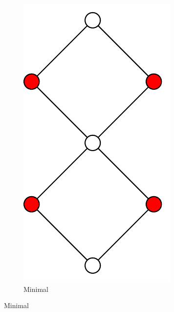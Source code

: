 \begin{figure}[ht]
  \centering
  \begin{subfigure}{0.25\textwidth}
    \centering
    \includegraphics[width=\textwidth]{img/example_minimal_vertex_cover.pdf}
    \caption{Minimal}
  \end{subfigure}
  \hspace{2em}
  \VRule

\end{figure}
